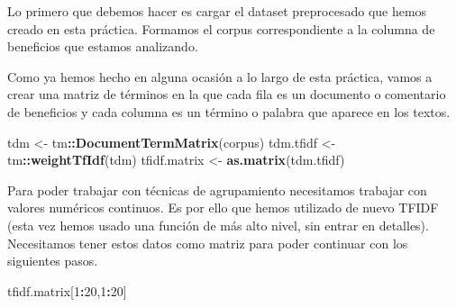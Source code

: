 \documentclass[spanish,]{article}
\newenvironment{Shaded}{\begin{snugshade}}{\end{snugshade}}
\newcommand{\KeywordTok}[1]{\textcolor[rgb]{0.13,0.29,0.53}{\textbf{#1}}}
\newcommand{\DataTypeTok}[1]{\textcolor[rgb]{0.13,0.29,0.53}{#1}}
\newcommand{\DecValTok}[1]{\textcolor[rgb]{0.00,0.00,0.81}{#1}}
\newcommand{\CharTok}[1]{\textcolor[rgb]{0.31,0.60,0.02}{#1}}
\newcommand{\StringTok}[1]{\textcolor[rgb]{0.31,0.60,0.02}{#1}}
\newcommand{\CommentTok}[1]{\textcolor[rgb]{0.56,0.35,0.01}{\textit{#1}}}
\newcommand{\OtherTok}[1]{\textcolor[rgb]{0.56,0.35,0.01}{#1}}
\newcommand{\OperatorTok}[1]{\textcolor[rgb]{0.81,0.36,0.00}{\textbf{#1}}}
\newcommand{\NormalTok}[1]{#1}
\begin{document}
Lo primero que debemos hacer es cargar el dataset preprocesado que hemos
creado en esta práctica. Formamos el corpus correspondiente a la columna
de beneficios que estamos analizando.

\begin{Shaded}
\end{Shaded}

Como ya hemos hecho en alguna ocasión a lo largo de esta práctica, vamos
a crear una matriz de términos en la que cada fila es un documento o
comentario de beneficios y cada columna es un término o palabra que
aparece en los textos.

\begin{Shaded}
\begin{Highlighting}[]
\NormalTok{tdm <-}\StringTok{ }\NormalTok{tm}\OperatorTok{::}\KeywordTok{DocumentTermMatrix}\NormalTok{(corpus)}
\NormalTok{tdm.tfidf <-}\StringTok{ }\NormalTok{tm}\OperatorTok{::}\KeywordTok{weightTfIdf}\NormalTok{(tdm)}
\NormalTok{tfidf.matrix <-}\StringTok{ }\KeywordTok{as.matrix}\NormalTok{(tdm.tfidf)}
\end{Highlighting}
\end{Shaded}

Para poder trabajar con técnicas de agrupamiento necesitamos trabajar
con valores numéricos continuos. Es por ello que hemos utilizado de
nuevo TFIDF (esta vez hemos usado una función de más alto nivel, sin
entrar en detalles). Necesitamos tener estos datos como matriz para
poder continuar con los siguientes pasos.

\newpage

\begin{Shaded}
\begin{Highlighting}[]
\NormalTok{tfidf.matrix[}\DecValTok{1}\OperatorTok{:}\DecValTok{20}\NormalTok{,}\DecValTok{1}\OperatorTok{:}\DecValTok{20}\NormalTok{]}
\end{Highlighting}
\end{Shaded}
\end{document}
